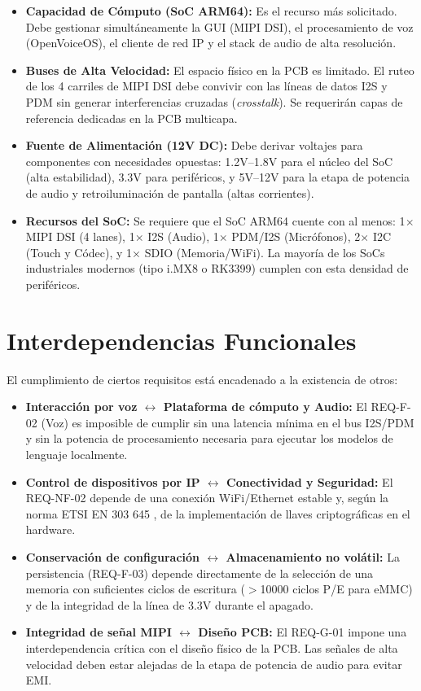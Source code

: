 \documentclass[%
	paper=a4,
	twoside=false,
	parskip=half,
	chapterprefix=false,
	10pt,
	headings=normal,
	bibliography=totoc,
	listof=totoc,
	titlepage=on,
	captions=tableabove,
	draft=false, 
]{scrbook}%
\begin{document}
\begin{itemize}
    \item \textbf{Capacidad de Cómputo (SoC ARM64):} Es el recurso más solicitado. Debe gestionar simultáneamente la GUI (MIPI DSI), el procesamiento de voz (OpenVoiceOS), el cliente de red IP y el stack de audio de alta resolución.
    \item \textbf{Buses de Alta Velocidad:} El espacio físico en la PCB es limitado. El ruteo de los 4 carriles de MIPI DSI debe convivir con las líneas de datos I2S y PDM sin generar interferencias cruzadas (\textit{crosstalk}). Se requerirán capas de referencia dedicadas en la PCB multicapa.
    \item \textbf{Fuente de Alimentación (12V DC):} Debe derivar voltajes para componentes con necesidades opuestas: 1.2V–1.8V para el núcleo del SoC (alta estabilidad), 3.3V para periféricos, y 5V–12V para la etapa de potencia de audio y retroiluminación de pantalla (altas corrientes).
    \item \textbf{Recursos del SoC:} Se requiere que el SoC ARM64 cuente con al menos: 1$\times$ MIPI DSI (4 lanes), 1$\times$ I2S (Audio), 1$\times$ PDM/I2S (Micrófonos), 2$\times$ I2C (Touch y Códec), y 1$\times$ SDIO (Memoria/WiFi). La mayoría de los SoCs industriales modernos (tipo i.MX8 o RK3399) cumplen con esta densidad de periféricos.
\end{itemize}

\section{Interdependencias Funcionales}

El cumplimiento de ciertos requisitos está encadenado a la existencia de otros:

\begin{itemize}
    \item \textbf{Interacción por voz $\leftrightarrow$ Plataforma de cómputo y Audio:} El REQ-F-02 (Voz) es imposible de cumplir sin una latencia mínima en el bus I2S/PDM y sin la potencia de procesamiento necesaria para ejecutar los modelos de lenguaje localmente.
    \item \textbf{Control de dispositivos por IP $\leftrightarrow$ Conectividad y Seguridad:} El REQ-NF-02 depende de una conexión WiFi/Ethernet estable y, según la norma ETSI EN 303 645 \cite{etsi303645}, de la implementación de llaves criptográficas en el hardware.
    \item \textbf{Conservación de configuración $\leftrightarrow$ Almacenamiento no volátil:} La persistencia (REQ-F-03) depende directamente de la selección de una memoria con suficientes ciclos de escritura ($>$10000 ciclos P/E para eMMC) y de la integridad de la línea de 3.3V durante el apagado.
    \item \textbf{Integridad de señal MIPI $\leftrightarrow$ Diseño PCB:} El REQ-G-01 impone una interdependencia crítica con el diseño físico de la PCB. Las señales de alta velocidad deben estar alejadas de la etapa de potencia de audio para evitar EMI.
\end{itemize}
\end{document}
